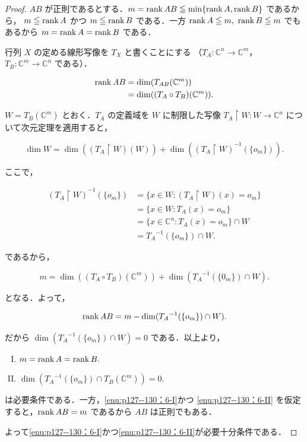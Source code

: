\documentclass[a4paper,10pt,fleqn]{ltjsarticle}
\begin{document}
\begin{tleftbar}
  \begin{proof}
    $AB$ が正則であるとする．$m = \rank AB \leqq \min\{\rank A,\rank B \}$ であるから，
    $m \leqq \rank A$ かつ $m \leqq \rank B$ である．一方 $\rank A \leqq m,\ \rank B \leqq m$ でもあるから
    $m = \rank A = \rank B$ である．

    行列 $X$ の定める線形写像を $T_X$ と書くことにする
    （$T_A \colon  \mathbb{C}^n \to \mathbb{C}^m$，$ T_B \colon  \mathbb{C}^m \to \mathbb{C}^n$ である）．

    \begin{align*}
      \rank AB & = \dim(T_{AB}(\mathbb{C}^m))           \\
               & = \dim((T_A \circ T_B)(\mathbb{C}^m)).
    \end{align*}

    $W = T_B(\mathbb{C}^m)$ とおく．$T_A$ の定義域を $W$ に制限した写像 $T_A \upharpoonright W : W \to \mathbb{C}^n$ について次元定理を適用すると，

    \[
      \dim W = \dim((T_A \upharpoonright W)(W)) + \dim((T_A \upharpoonright W)^{-1}(\{o_m\})).
    \]

    ここで，

    \begin{align*}
      (T_A \upharpoonright W)^{-1}(\{o_m\}) & = \{ x \in W : (T_A \upharpoonright W)(x) = o_m \} \\
                                            & = \{ x \in W : T_A(x) = o_m \}                     \\
                                            & = \{ x \in \mathbb{C}^n : T_A(x) = o_m \} \cap W   \\
                                            & = {T_A}^{-1}(\{o_m\}) \cap W.
    \end{align*}

    であるから，

    \[
      m = \dim((T_A \circ T_B)(\mathbb{C}^m)) + \dim({T_A}^{-1}(\{0_m\}) \cap W).
    \]

    となる．よって，

    \[
      \rank AB = m - \dim({T_A}^{-1}(\{o_m\}) \cap W).
    \]

    だから $\dim({T_A}^{-1}(\{o_m\}) \cap W) = 0$ である．以上より，

    \begin{enumerate}[(I)]
      \item $m = \rank A = \rank B.$ \label{enu:p127--130：6-I}
      \item $\dim({T_A}^{-1}(\{o_m\}) \cap T_B(\mathbb{C}^m)) = 0.$\label{enu:p127--130：6-II}
    \end{enumerate}

    は必要条件である．一方，\ref{enu:p127--130：6-I}かつ \ref{enu:p127--130：6-II} を仮定すると，$\rank AB = m$ であるから $AB$ は正則でもある．

    よって\ref{enu:p127--130：6-I}かつ\ref{enu:p127--130：6-II}が必要十分条件である．
  \end{proof}
\end{tleftbar}
\newpage
\end{document}
